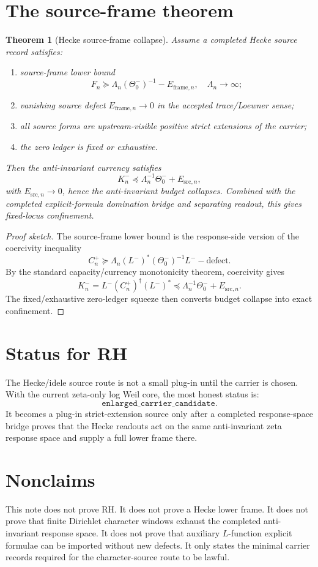 \documentclass[11pt]{article}
\newtheorem{theorem}{Theorem}[section]
\begin{document}
\section{The source-frame theorem}
\begin{theorem}[Hecke source-frame collapse]
Assume a completed Hecke source record satisfies:
\begin{enumerate}[label=(\roman*)]
\item source-frame lower bound
\[
 F_n\succeq \Lambda_n(\Theta_0^-)^{-1}-E_{\mathrm{frame},n},
 \quad \Lambda_n\to\infty;
\]
\item vanishing source defect $E_{\mathrm{frame},n}\to0$ in the accepted trace/Loewner sense;
\item all source forms are upstream-visible positive strict extensions of the carrier;
\item the zero ledger is fixed or exhaustive.
\end{enumerate}
Then the anti-invariant currency satisfies
\[
  K_n^-\preceq \Lambda_n^{-1}\Theta_0^- + E_{\mathrm{src},n},
\]
with $E_{\mathrm{src},n}\to0$, hence the anti-invariant budget collapses. Combined with the completed explicit-formula domination bridge and separating readout, this gives fixed-locus confinement.
\end{theorem}

\begin{proof}[Proof sketch]
The source-frame lower bound is the response-side version of the coercivity inequality
\[
 C_{n}^{+}\succeq \Lambda_n(L^-)^*(\Theta_0^-)^{-1}L^- - \text{defect}.
\]
By the standard capacity/currency monotonicity theorem, coercivity gives
\[
 K_n^-=L^-(C_n^+)^\dagger(L^-)^*\preceq \Lambda_n^{-1}\Theta_0^-+E_{\mathrm{src},n}.
\]
The fixed/exhaustive zero-ledger squeeze then converts budget collapse into exact confinement.
\end{proof}

\section{Status for RH}
The Hecke/idele source route is not a small plug-in until the carrier is chosen. With the current zeta-only log Weil core, the most honest status is:
\[
 \boxed{\texttt{enlarged\_carrier\_candidate}.}
\]
It becomes a plug-in strict-extension source only after a completed response-space bridge proves that the Hecke readouts act on the same anti-invariant zeta response space and supply a full lower frame there.

\section{Nonclaims}
This note does not prove RH. It does not prove a Hecke lower frame. It does not prove that finite Dirichlet character windows exhaust the completed anti-invariant response space. It does not prove that auxiliary $L$-function explicit formulae can be imported without new defects. It only states the minimal carrier records required for the character-source route to be lawful.
\end{document}
